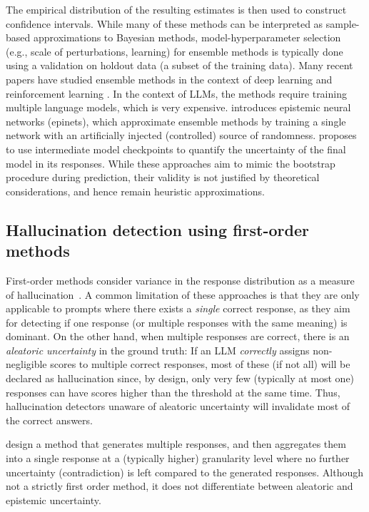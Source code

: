 The empirical distribution of the resulting estimates is then used to construct confidence intervals.
While many of these methods can be interpreted as sample-based approximations to Bayesian methods, model-hyperparameter selection (e.g., scale of perturbations, learning) for ensemble methods is typically done using a validation on holdout data (a subset of the training data).
Many recent papers have studied ensemble methods in the context of deep learning and reinforcement learning \citep{OV2015,LPB2017,MG2020}.
In the context of LLMs, the methods require training multiple language models, which is very expensive. \citet{osband2023epistemic} introduces epistemic neural networks (epinets), which approximate ensemble methods by training a single network with an artificially injected (controlled) source of randomness.
\citet{rabanser2022selective} proposes to use intermediate model checkpoints to quantify the uncertainty of the final model in its responses.
While these approaches aim to mimic the bootstrap procedure during prediction, their validity is not justified by theoretical considerations, and hence remain heuristic approximations.


\subsection{Hallucination detection using first-order methods}
\label{sec:related-hallucination-detection-first-order}

First-order methods consider variance in the response distribution as a measure of hallucination~\citep{KCAHD2022,CZGEDE2023,MLG2023,LTS2023,KuhnARXIV2023,wang2023selfconsistency,JRHLPGB-2023,ZLDMK-2023,zhao2024knowing,conformal-abstention-2024}.
%
A common limitation of these approaches is that
they are only applicable to prompts where there exists a \emph{single} correct
response, as they aim for detecting if one response (or multiple responses with the same
meaning) is dominant.
%
%
On the other hand, when multiple responses are correct, there is an
\emph{aleatoric uncertainty} in the ground truth: If an LLM \emph{correctly}
assigns non-negligible scores to multiple correct responses, most of these (if
not all) will be declared as hallucination since, by design, only very few
(typically at most one) responses can have scores higher than the threshold at
the same time.
Thus, hallucination detectors unaware of aleatoric uncertainty will invalidate
most of the correct answers.

\citet{Yona2024narrowing} design a method that generates multiple responses, and then aggregates them into a single response at a (typically higher) granularity level where no further uncertainty (contradiction) is left compared to the generated responses. Although not a strictly first order method, it does not differentiate between aleatoric and epistemic uncertainty.



